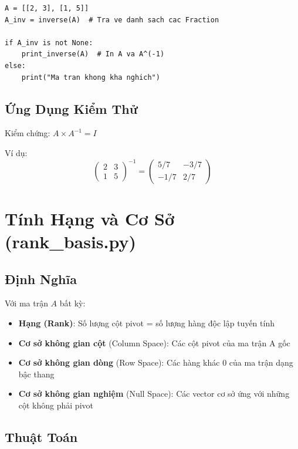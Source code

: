 \documentclass[12pt, a4paper, twoside]{article}
\begin{document}
\begin{lstlisting}
A = [[2, 3], [1, 5]]
A_inv = inverse(A)  # Tra ve danh sach cac Fraction

if A_inv is not None:
    print_inverse(A)  # In A va A^(-1)
else:
    print("Ma tran khong kha nghich")
\end{lstlisting}

\subsection{Ứng Dụng Kiểm Thử}

Kiểm chứng: $A \times A^{-1} = I$

Ví dụ:
\[
\begin{pmatrix} 2 & 3 \\ 1 & 5 \end{pmatrix}^{-1} = \begin{pmatrix} 5/7 & -3/7 \\ -1/7 & 2/7 \end{pmatrix}
\]

\newpage

\section{Tính Hạng và Cơ Sở (rank\_basis.py)}

\subsection{Định Nghĩa}

Với ma trận $A$ bất kỳ:

\begin{itemize}
    \item \textbf{Hạng (Rank)}: Số lượng cột pivot = số lượng hàng độc lập tuyến tính
    
    \item \textbf{Cơ sở không gian cột} (Column Space): Các cột pivot của ma trận A gốc
    
    \item \textbf{Cơ sở không gian dòng} (Row Space): Các hàng khác 0 của ma trận dạng bậc thang
    
    \item \textbf{Cơ sở không gian nghiệm} (Null Space): Các vector cơ sở ứng với những cột không phải pivot
\end{itemize}

\subsection{Thuật Toán}
\end{document}
